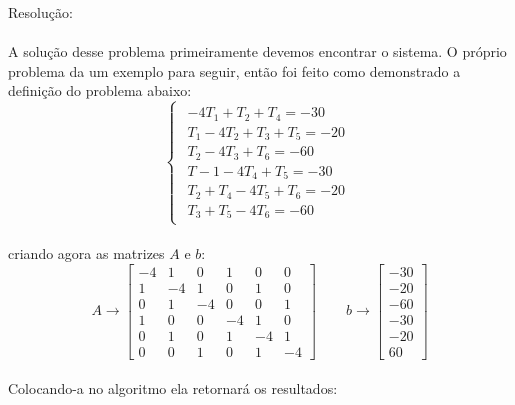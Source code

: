 \documentclass[
12pt,				%
openright,			%
twoside,			%
a4paper,			%
english,			%
french,				%
spanish,			%
brazil				%
]{abntex2_new}
\begin{document}
		Resolução:\\
		\\
		A solução desse problema primeiramente devemos encontrar o sistema. O próprio
		problema
		da um exemplo para seguir, então foi feito como demonstrado a definição do
		problema abaixo:\\
		$$\begin{cases}
		\begin{aligned}
		-4T_1+T_2+T_4=-30\\
		T_1-4T_2+T_3+T_5=-20\\
		T_2-4T_3+T_6=-60\\
		T-1-4T_4+T_5=-30\\
		T_2+T_4-4T_5+T_6=-20\\
		T_3+T_5-4T_6=-60
		\end{aligned}
		\end{cases}$$\\
		criando agora as matrizes $A$ e $b$:\\
		$$	A \rightarrow   \begin{bmatrix}
		-4 & 1 & 0 & 1 & 0 & 0 \\
		1 & -4 & 1 & 0 & 1 & 0 \\
		0 & 1 & -4 & 0 & 0 & 1 \\
		1 & 0 & 0 & -4 & 1 & 0 \\
		0 & 1 & 0 & 1 & -4 & 1 \\
		0 & 0 & 1 & 0 & 1 & -4 
		\end{bmatrix} \hspace{25pt}
		b \rightarrow  \begin{bmatrix}
		-30\\
		-20\\
		-60\\
		-30\\
		-20\\
		60
		\end{bmatrix}
		$$\\
		
		Colocando-a no algoritmo ela retornará os resultados:
		
\end{document}
